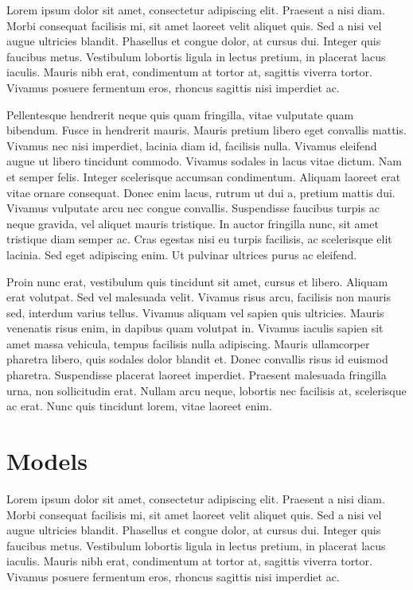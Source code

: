\documentclass[titlepage,a4paper,12pt,thmsb]{report}
\begin{document}
Lorem ipsum dolor sit amet, consectetur adipiscing elit. Praesent a nisi diam. Morbi consequat facilisis mi, sit amet laoreet velit aliquet quis. Sed a nisi vel augue ultricies blandit. Phasellus et congue dolor, at cursus dui. Integer quis faucibus metus. Vestibulum lobortis ligula in lectus pretium, in placerat lacus iaculis. Mauris nibh erat, condimentum at tortor at, sagittis viverra tortor. Vivamus posuere fermentum eros, rhoncus sagittis nisi imperdiet ac.

Pellentesque hendrerit neque quis quam fringilla, vitae vulputate quam bibendum. Fusce in hendrerit mauris. Mauris pretium libero eget convallis mattis. Vivamus nec nisi imperdiet, lacinia diam id, facilisis nulla. Vivamus eleifend augue ut libero tincidunt commodo. Vivamus sodales in lacus vitae dictum. Nam et semper felis. Integer scelerisque accumsan condimentum. Aliquam laoreet erat vitae ornare consequat. Donec enim lacus, rutrum ut dui a, pretium mattis dui. Vivamus vulputate arcu nec congue convallis. Suspendisse faucibus turpis ac neque gravida, vel aliquet mauris tristique. In auctor fringilla nunc, sit amet tristique diam semper ac. Cras egestas nisi eu turpis facilisis, ac scelerisque elit lacinia. Sed eget adipiscing enim. Ut pulvinar ultrices purus ac eleifend.

Proin nunc erat, vestibulum quis tincidunt sit amet, cursus et libero. Aliquam erat volutpat. Sed vel malesuada velit. Vivamus risus arcu, facilisis non mauris sed, interdum varius tellus. Vivamus aliquam vel sapien quis ultricies. Mauris venenatis risus enim, in dapibus quam volutpat in. Vivamus iaculis sapien sit amet massa vehicula, tempus facilisis nulla adipiscing. Mauris ullamcorper pharetra libero, quis sodales dolor blandit et. Donec convallis risus id euismod pharetra. Suspendisse placerat laoreet imperdiet. Praesent malesuada fringilla urna, non sollicitudin erat. Nullam arcu neque, lobortis nec facilisis at, scelerisque ac erat. Nunc quis tincidunt lorem, vitae laoreet enim.


\chapter{Models}

Lorem ipsum dolor sit amet, consectetur adipiscing elit. Praesent a nisi diam. Morbi consequat facilisis mi, sit amet laoreet velit aliquet quis. Sed a nisi vel augue ultricies blandit. Phasellus et congue dolor, at cursus dui. Integer quis faucibus metus. Vestibulum lobortis ligula in lectus pretium, in placerat lacus iaculis. Mauris nibh erat, condimentum at tortor at, sagittis viverra tortor. Vivamus posuere fermentum eros, rhoncus sagittis nisi imperdiet ac.
\end{document}
